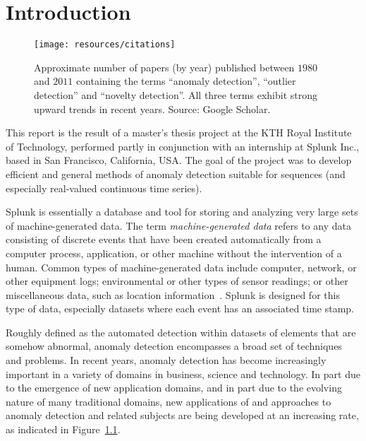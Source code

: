 \chapter{Introduction}

\begin{figure}[htb]
    \vspace{-10pt}
    \begin{center}
        \texttt{[image: resources/citations]}
    \end{center}
    \vspace{-20pt}
    \caption{\small Approximate number of papers (by year) published between $1980$ and $2011$ containing the terms ``anomaly detection'', ``outlier detection'' and ``novelty detection''. All three terms exhibit strong upward trends in recent years. Source: Google Scholar.}
    \vspace{-0pt}
\label{fig:citations}
\end{figure}

This report is the result of a master's thesis project at the KTH Royal Institute of Technology, performed partly in conjunction with an internship at Splunk Inc.\@, based in San Francisco, California, USA\@. The goal of the project was to develop efficient and general methods of anomaly detection suitable for sequences (and especially real-valued continuous time series).

Splunk is essentially a database and tool for storing and analyzing very large sets of machine-generated data. The term \emph{machine-generated data} refers to any data consisting of discrete events that have been created automatically from a computer process, application, or other machine without the intervention of a human. Common types of machine-generated data include computer, network, or other equipment logs; environmental or other types of sensor readings; or other miscellaneous data, such as location information~\cite{machine_data}. Splunk is designed for this type of data, especially datasets where each event has an associated time stamp.

Roughly defined as the automated detection within datasets of elements that are somehow abnormal, anomaly detection encompasses a broad set of techniques and problems. In recent years, anomaly detection has become increasingly important in a variety of domains in business, science and technology. In part due to the emergence of new application domains, and in part due to the evolving nature of many traditional domains, new applications of and approaches to anomaly detection and related subjects are being developed at an increasing rate, as indicated in Figure~\ref{fig:citations}.


